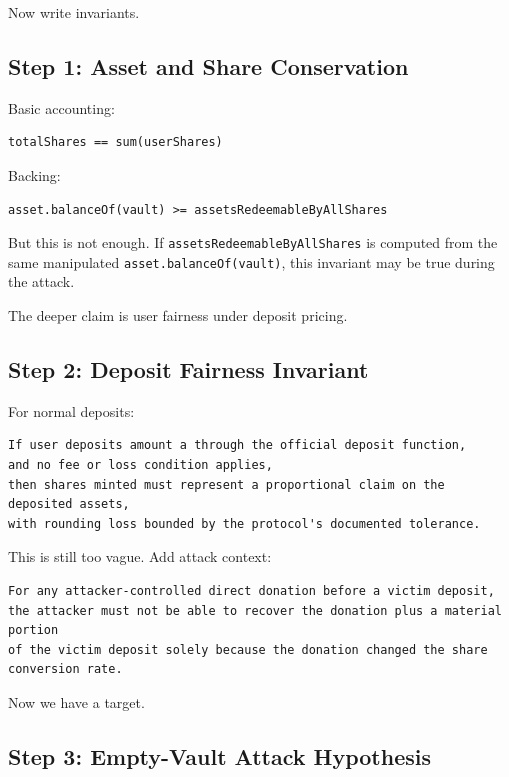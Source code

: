 Now write invariants.

\subsection{Step 1: Asset and Share Conservation}

Basic accounting:

\begin{lstlisting}
totalShares == sum(userShares)
\end{lstlisting}

Backing:

\begin{lstlisting}
asset.balanceOf(vault) >= assetsRedeemableByAllShares
\end{lstlisting}

But this is not enough. If
\passthrough{\lstinline!assetsRedeemableByAllShares!} is computed from
the same manipulated \passthrough{\lstinline!asset.balanceOf(vault)!},
this invariant may be true during the attack.

The deeper claim is user fairness under deposit pricing.

\subsection{Step 2: Deposit Fairness Invariant}

For normal deposits:

\begin{lstlisting}
If user deposits amount a through the official deposit function,
and no fee or loss condition applies,
then shares minted must represent a proportional claim on the deposited assets,
with rounding loss bounded by the protocol's documented tolerance.
\end{lstlisting}

This is still too vague. Add attack context:

\begin{lstlisting}
For any attacker-controlled direct donation before a victim deposit,
the attacker must not be able to recover the donation plus a material portion
of the victim deposit solely because the donation changed the share conversion rate.
\end{lstlisting}

Now we have a target.

\subsection{Step 3: Empty-Vault Attack Hypothesis}

